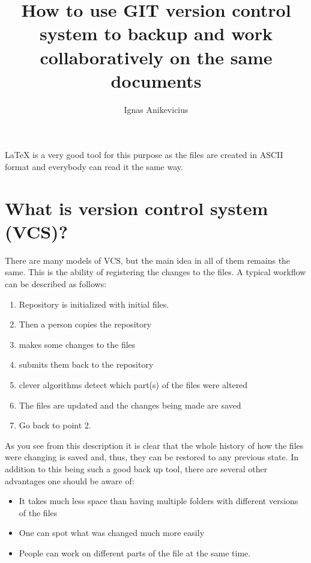 


\title{How to use GIT version control system to backup and work collaboratively
on the same documents}
\author{Ignas Anikevicius}



\maketitle

\LaTeX{} is a very good tool for this purpose as the files are created in ASCII
format and everybody can read it the same way.

\tableofcontents

\section{What is version control system (VCS)?}

There are many models of VCS, but the main idea in all of them remains the same.
This is the ability of registering the changes to the files. A typical workflow
can be described as follows:
\begin{enumerate}
    \item Repository is initialized with initial files.
    \item Then a person copies the repository
    \item makes some changes to the files
    \item submits them back to the repository 
    \item clever algorithms detect  which part(s) of the files were altered 
    \item The files are updated and the changes being made are saved
    \item Go back to point 2.
\end{enumerate}

As you see from this description it is clear that the whole history of how the
files were changing is saved and, thus, they can be restored to any previous
state. In addition to this being such a good back up tool, there are several
other advantages one should be aware of:
\begin{itemize}
    \item It takes much less space than having multiple folders with different
        versions of the files
    \item One can spot what was changed much more easily
    \item People can work on different parts of the file at the same time.
\end{itemize}

